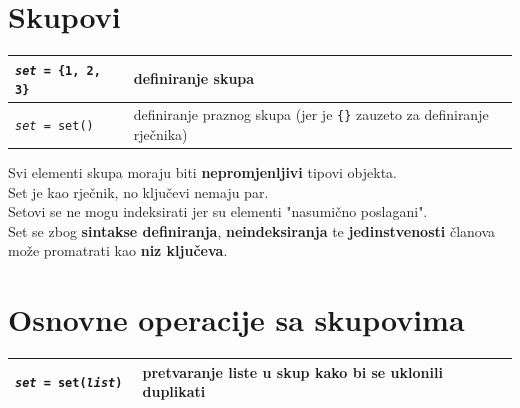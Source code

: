 \documentclass[10pt]{article}
\begin{document}
    \section*{\color{NavyBlue} Skupovi}
    \begin{tabular}{|>{\tt}p{9.00cm}|>{}p{15.50cm}|}
        \hline
        \textit{set} = \{1, 2, 3\} & definiranje skupa
        \\ \hline
        \textit{set} = set() & definiranje praznog skupa (jer je \texttt{\{\}} zauzeto za definiranje rječnika)
        \\ \hline
    \end{tabular}
    \begin{center}
        \footnotesize
        Svi elementi skupa moraju biti \textbf{nepromjenljivi} tipovi objekta. \\
        Set je kao rječnik, no ključevi nemaju par. \\
        Setovi se ne mogu indeksirati jer su elementi "nasumično poslagani". \\
        Set se zbog \textbf{sintakse definiranja}, \textbf{neindeksiranja} te \textbf{jedinstvenosti} članova može promatrati kao \textbf{niz ključeva}.
    \end{center}

    \section*{\color{NavyBlue} Osnovne operacije sa skupovima}
    \begin{tabular}{|>{\tt}p{9.00cm}|>{}p{15.50cm}|}
        \hline
        \textit{set} = set(\textit{list}) & pretvaranje liste u skup kako bi se uklonili duplikati
        \\ \hline
    \end{tabular}
\end{document}
